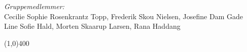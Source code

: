 \vspace*{\fill}
\begin{center}
	\textit{Gruppemedlemmer:}\\
	Cecilie Sophie Rosenkrantz Topp, Frederik Skou Nielsen, Josefine Dam Gade \\
	Line Sofie Hald, Morten Skaarup Larsen, Rana Haddang
\end{center}
\begin{center}
	\line(1,0){400}
\end{center}